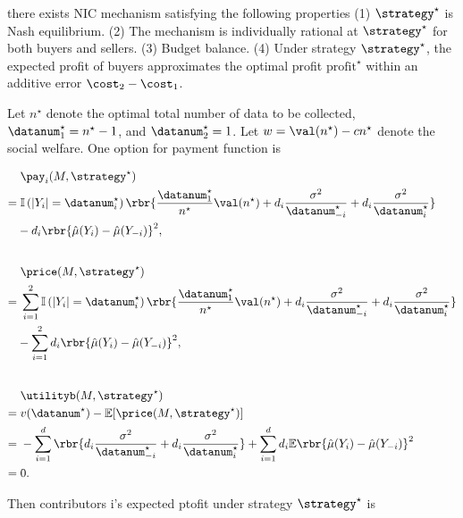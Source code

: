 \begin{theorem}
    there exists NIC mechanism satisfying the following properties (1) $\strategy^{\star}$ is Nash equilibrium. (2) The mechanism is individually rational at $\strategy^{\star}$ for both buyers and sellers. (3) Budget balance. (4) Under strategy $\strategy^{\star}$, the expected profit of buyers approximates the optimal profit $ \mathrm{profit}^{\star}$ within an additive error $\cost_2 - \cost_1$. 
\end{theorem}


Let $n^{\star}$ denote the optimal total number of data to be collected, $\datanum_1^{\star}=n^{\star}-1$, and $\datanum_2^{\star}=1$. Let $w=\val(n^{\star})-cn^{\star}$ denote the social welfare. One option for payment function is

\begin{align*}
    &\; \pay_i(M,\strategy^{\star}) \\  
    = & \;\mathbb{I}\left( \left| Y_i \right| = \datanum_i^{\star} \right) \rbr{\frac{\datanum_1^{\star}}{n^{\star}}\val(n^{\star})+d_i \frac{\sigma^2}{\datanum_{-i}^{\star}} +d_i \frac{\sigma^2}{\datanum_i^{\star}} } \\ & - d_i \rbr{\hat{\mu}(Y_i)-\hat{\mu}(Y_{-i}) }^2, \\[20pt] %
    &\; \price(M,\strategy^{\star}) \\  
    = & \; \sum_{i=1}^{2}\mathbb{I}\left(  \left| Y_i \right| = \datanum_i^{\star} \right) \rbr{\frac{\datanum_1^{\star}}{n^{\star}}\val(n^{\star}) +d_i \frac{\sigma^2}{\datanum_{-i}^{\star}} +d_i \frac{\sigma^2}{\datanum_i^{\star}} } \\ 
    & - \sum_{i=1}^{2} d_i \rbr{\hat{\mu}(Y_i)-\hat{\mu}(Y_{-i}) }^2, \\[20pt] %
    &\;  \utilityb (M,\strategy^{\star}) \\ 
   = & \; v(\datanum^{\star}) -\mathbb{E}[\price(M,\strategy^{\star})] \\ 
    = & \; - \sum_{i=1}^{d} \rbr{d_i \frac{\sigma^2}{\datanum_{-i}^{\star}} +d_i \frac{\sigma^2}{\datanum_i^{\star}}  } + \sum_{i=1}^{d}d_i \mathbb{E} \rbr{\hat{\mu}(Y_i)-\hat{\mu}(Y_{-i}) }^2 \\ 
    = & \; 0.
\end{align*}



Then contributors i's expected ptofit under strategy $\strategy^{\star}$ is 

